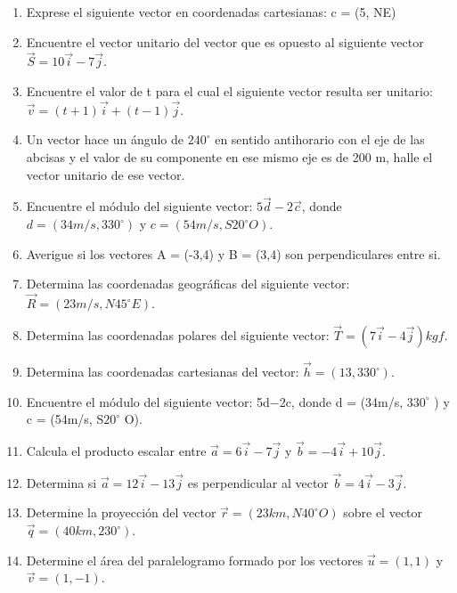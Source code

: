 \begin{enumerate}
 \item Exprese el siguiente vector en coordenadas cartesianas: c = (5, NE)
 
 \item Encuentre el vector unitario del vector que es opuesto al siguiente vector $\vec{S} =  10\vec{i}-7\vec{j}$.
 
 \item Encuentre el valor de t para el cual el siguiente vector resulta ser unitario: $\vec{v} = (t+1)\vec{i} +(t-1)\vec{j}$.

 
 \item Un vector hace un ángulo de $240^\circ$ en sentido antihorario con el eje de las abcisas y el valor de su componente 
en ese mismo eje es de 200 m, halle el vector unitario de ese vector.
 
 \item Encuentre el módulo del siguiente vector: $5\vec{d}-2\vec{c}$, donde $d=(34 m/s, 330^\circ)$ y $c = (54m/s, S20^\circ 
O)$.

\item Averigue si los vectores A = (-3,4) y B = (3,4) son perpendiculares entre si.
 
 \item Determina las coordenadas geográficas del siguiente vector: $\vec{R}=(23 m/s,N45^\circ E)$.
 
 \item Determina las coordenadas polares del siguiente vector: $\vec{T}=(7\vec{i}-4\vec{j})kgf$.
 
 \item Determina las coordenadas cartesianas del vector: $\vec{h}=(13,330^\circ)$.
 
 \item Encuentre el módulo del siguiente vector: 5d−2c, donde d = (34m/s, $330^\circ$ ) y c = (54m/s,
S$20^\circ$ O).

 \item Calcula el producto escalar entre $\vec{a}=6\vec{i}-7\vec{j}$ y $\vec{b}=-4\vec{i}+10\vec{j}$.

\item Determina si $\vec{a} = 12\vec{i}-13\vec{j}$ es perpendicular al vector $\vec{b}=4\vec{i}-3\vec{j}$.

\item Determine la proyección del vector $\vec{r} = (23 km, N40^\circ O)$ sobre el vector $\vec{q}=(40km,230^\circ)$.

\item Determine el área del paralelogramo formado por los vectores $\vec{u}=(1,1)$ y $\vec{v}=(1,-1)$.


\end{enumerate}
